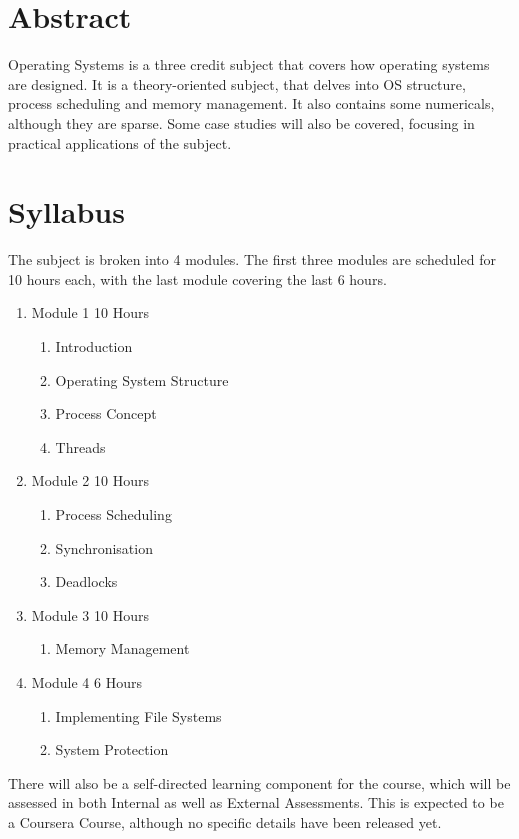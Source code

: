 \section*{Abstract}
Operating Systems is a three credit subject that covers how operating systems are designed. It is a theory-oriented subject, that delves into OS structure, process scheduling and memory management. It also contains some numericals, although they are sparse. Some case studies will also be covered, focusing in practical applications of the subject.

\section*{Syllabus}
The subject is broken into 4 modules. The first three modules are scheduled for 10 hours each, with the last module covering the last 6 hours.
\begin{enumerate}
    \item Module 1 \hfill 10 Hours 
    \begin{enumerate}
        \item Introduction
        \item Operating System Structure
        \item Process Concept
        \item Threads
    \end{enumerate}
    \item Module 2 \hfill 10 Hours
    \begin{enumerate}
        \item Process Scheduling
        \item Synchronisation
        \item Deadlocks
    \end{enumerate}
    \item Module 3 \hfill 10 Hours
    \begin{enumerate}
        \item Memory Management
    \end{enumerate}
    \item Module 4 \hfill 6 Hours
    \begin{enumerate}
        \item Implementing File Systems
        \item System Protection
    \end{enumerate}
\end{enumerate}

There will also be a self-directed learning component for the course, which will be assessed in both Internal as well as External Assessments. This is expected to be a Coursera Course, although no specific details have been released yet.

